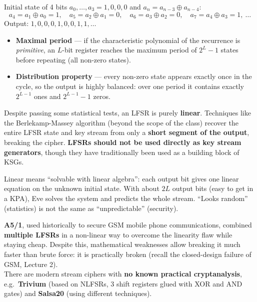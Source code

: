 \begin{exbox}[title=LFSR example]
Initial state of 4 bits $a_0, \ldots, a_3 = 1, 0, 0, 0$ and $a_n = a_{n-3} \oplus
a_{n-4}$:
\[
  a_4 = a_1 \oplus a_0 = 1,\quad a_5 = a_2 \oplus a_1 = 0,\quad
  a_6 = a_3 \oplus a_2 = 0,\quad a_7 = a_4 \oplus a_3 = 1,\ \ldots
\]
Output: $1, 0, 0, 0, 1, 0, 0, 1, 1, \ldots$
\end{exbox}

\begin{propbox}[title=Randomness of LFSRs]
\begin{itemize}
  \item \textbf{Maximal period} --- if the characteristic polynomial of the recurrence is
        \emph{primitive}, an $L$-bit register reaches the maximum period of
        $2^L - 1$ states before repeating (all non-zero states).
  \item \textbf{Distribution property} --- every non-zero state appears exactly once in
        the cycle, so the output is highly balanced: over one period it contains exactly
        $2^{L-1}$ ones and $2^{L-1} - 1$ zeros.
\end{itemize}
\end{propbox}

\begin{warnbox}[title=LFSR --- math danger]
Despite passing some statistical tests, an LFSR is purely \textbf{linear}. Techniques like
the Berlekamp-Massey algorithm (beyond the scope of the class) recover the entire LFSR
state and key stream from only a \textbf{short segment of the output}, breaking the
cipher. \textbf{LFSRs should not be used directly as key stream generators}, though they
have traditionally been used as a building block of KSGs.
\end{warnbox}

\begin{rembox}[title=Why linearity is fatal]
Linear means ``solvable with linear algebra'': each output bit gives one linear equation
on the unknown initial state. With about $2L$ output bits (easy to get in a KPA), Eve
solves the system and predicts the whole stream. ``Looks random'' (statistics) is not the
same as ``unpredictable'' (security).
\end{rembox}

\begin{exbox}[title={A5/1 and modern stream ciphers}]
\textbf{A5/1}, used historically to secure GSM mobile phone communications, combined
\textbf{multiple LFSRs} in a non-linear way to overcome the linearity flaw while staying
cheap. Despite this, mathematical weaknesses allow breaking it much faster than brute
force: it is practically broken (recall the closed-design failure of GSM, Lecture 2). \\
There are modern stream ciphers with \textbf{no known practical cryptanalysis}, e.g.\
\textbf{Trivium} (based on NLFSRs, 3 shift registers glued with XOR and AND gates) and
\textbf{Salsa20} (using different techniques).
\end{exbox}

